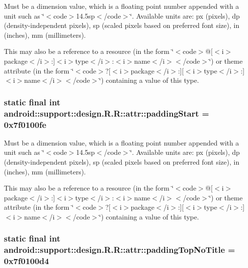 Must be a dimension value, which is a floating point number appended with a unit such as \char`\"{}$<$code$>$14.5sp$<$/code$>$\char`\"{}. Available units are: px (pixels), dp (density-independent pixels), sp (scaled pixels based on preferred font size), in (inches), mm (millimeters). 

This may also be a reference to a resource (in the form \char`\"{}$<$code$>$@\mbox{[}$<$i$>$package$<$/i$>$:\mbox{]}$<$i$>$type$<$/i$>$:$<$i$>$name$<$/i$>$$<$/code$>$\char`\"{}) or theme attribute (in the form \char`\"{}$<$code$>$?\mbox{[}$<$i$>$package$<$/i$>$:\mbox{]}\mbox{[}$<$i$>$type$<$/i$>$:\mbox{]}$<$i$>$name$<$/i$>$$<$/code$>$\char`\"{}) containing a value of this type. \hypertarget{classandroid_1_1support_1_1design_1_1_r_1_1attr_dcf4d5e260397b31d828e4e5bb8443f0}{
\subsubsection[{paddingStart}]{\setlength{\rightskip}{0pt plus 5cm}static final int android::support::design.R.R::attr::paddingStart = 0x7f0100fe}}
\label{classandroid_1_1support_1_1design_1_1_r_1_1attr_dcf4d5e260397b31d828e4e5bb8443f0}


Must be a dimension value, which is a floating point number appended with a unit such as \char`\"{}$<$code$>$14.5sp$<$/code$>$\char`\"{}. Available units are: px (pixels), dp (density-independent pixels), sp (scaled pixels based on preferred font size), in (inches), mm (millimeters). 

This may also be a reference to a resource (in the form \char`\"{}$<$code$>$@\mbox{[}$<$i$>$package$<$/i$>$:\mbox{]}$<$i$>$type$<$/i$>$:$<$i$>$name$<$/i$>$$<$/code$>$\char`\"{}) or theme attribute (in the form \char`\"{}$<$code$>$?\mbox{[}$<$i$>$package$<$/i$>$:\mbox{]}\mbox{[}$<$i$>$type$<$/i$>$:\mbox{]}$<$i$>$name$<$/i$>$$<$/code$>$\char`\"{}) containing a value of this type. \hypertarget{classandroid_1_1support_1_1design_1_1_r_1_1attr_3237111ae2a9ec60ade9344345f1336b}{
\subsubsection[{paddingTopNoTitle}]{\setlength{\rightskip}{0pt plus 5cm}static final int android::support::design.R.R::attr::paddingTopNoTitle = 0x7f0100d4}}
\label{classandroid_1_1support_1_1design_1_1_r_1_1attr_3237111ae2a9ec60ade9344345f1336b}


